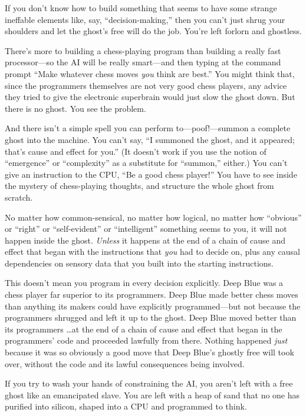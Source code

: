 {
 If you don't know how to build something that
seems to have some strange ineffable elements like, say,
``decision-making,'' then you
can't just shrug your shoulders and let the
ghost's free will do the job. You're
left forlorn and ghostless.}

{
 There's more to building a chess-playing program
than building a really fast processor---so the AI will be really
smart---and then typing at the command prompt ``Make
whatever chess moves \textit{you} think are best.''
You might think that, since the programmers themselves are not very
good chess players, any advice they tried to give the electronic
superbrain would just slow the ghost down. But there is no ghost. You
see the problem.}

{
 And there isn't a simple spell you can perform
to---poof!---summon a complete ghost into the machine. You
can't say, ``I summoned the ghost, and
it appeared; that's cause and effect for
you.'' (It doesn't work if you use
the notion of ``emergence'' or
``complexity'' as a substitute for
``summon,'' either.) You
can't give an instruction to the CPU,
``Be a good chess player!'' You have
to see inside the mystery of chess-playing thoughts, and structure the
whole ghost from scratch.}

{
 No matter how common-sensical, no matter how logical, no matter
how ``obvious'' or
``right'' or
``self-evident'' or
``intelligent'' something seems to
you, it will not happen inside the ghost. \textit{Unless} it happens at
the end of a chain of cause and effect that began with the instructions
that \textit{you} had to decide on, plus any causal dependencies on
sensory data that you built into the starting instructions.}

{
 This doesn't mean you program in every decision
explicitly. Deep Blue was a chess player far superior to its
programmers. Deep Blue made better chess moves than anything its makers
could have explicitly programmed---but not because the programmers
shrugged and left it up to the ghost. Deep Blue moved better than its
programmers \ldots at the end of a chain of cause and effect that began
in the programmers' code and proceeded lawfully from
there. Nothing happened \textit{just} because it was so obviously a
good move that Deep Blue's ghostly free will took over,
without the code and its lawful consequences being involved.}

{
 If you try to wash your hands of constraining the AI, you
aren't left with a free ghost like an emancipated
slave. You are left with a heap of sand that no one has purified into
silicon, shaped into a CPU and programmed to think.}

